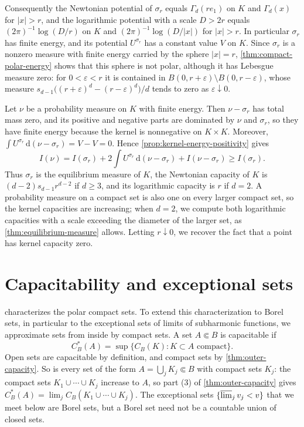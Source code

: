 \begin{example}
Consequently the Newtonian potential of $\sigma_r$ equals $\Gamma_d(re_1)$ on $K$ and $\Gamma_d(x)$ for $|x|>r$, and the logarithmic potential with a scale $D>2r$ equals $(2\pi)^{-1}\log(D/r)$ on $K$ and $(2\pi)^{-1}\log(D/|x|)$ for $|x|>r$. In particular $\sigma_r$ has finite energy, and its potential $U^{\sigma_r}$ has a constant value $V$ on $K$. Since $\sigma_r$ is a nonzero measure with finite energy carried by the sphere $|x|=r$, \cref{thm:compact-polar-energy} shows that this sphere is not polar, although it has Lebesgue measure zero: for $0<\varepsilon<r$ it is contained in $B(0,r+\varepsilon)\setminus B(0,r-\varepsilon)$, whose measure $s_{d-1}\bigl((r+\varepsilon)^d-(r-\varepsilon)^d\bigr)/d$ tends to zero as $\varepsilon\downarrow0$.

Let $\nu$ be a probability measure on $K$ with finite energy. Then $\nu-\sigma_r$ has total mass zero, and its positive and negative parts are dominated by $\nu$ and $\sigma_r$, so they have finite energy because the kernel is nonnegative on $K\times K$. Moreover, $\int U^{\sigma_r}\,\mathrm d(\nu-\sigma_r)=V-V=0$. Hence \cref{prop:kernel-energy-positivity} gives
\[
 I(\nu)=I(\sigma_r)+2\int U^{\sigma_r}\,\mathrm d(\nu-\sigma_r)+I(\nu-\sigma_r)\geq I(\sigma_r).
\]
Thus $\sigma_r$ is the equilibrium measure of $K$, the Newtonian capacity of $K$ is $(d-2)s_{d-1}r^{d-2}$ if $d\geq3$, and its logarithmic capacity is $r$ if $d=2$. A probability measure on a compact set is also one on every larger compact set, so the kernel capacities are increasing; when $d=2$, we compute both logarithmic capacities with a scale exceeding the diameter of the larger set, as \cref{thm:equilibrium-measure} allows. Letting $r\downarrow0$, we recover the fact that a point has kernel capacity zero.
\end{example}

\section{Capacitability and exceptional sets}
\label{sec:capacitable-exceptions}
 characterizes the polar compact sets. To extend this characterization to Borel sets, in particular to the exceptional sets of limits of subharmonic functions, we approximate sets from inside by compact sets. A set $A\Subset B$ is capacitable if
\[
 C_B^*(A)=\sup\{C_B(K):K\subset A\text{ compact}\}.
\]
Open sets are capacitable by definition, and compact sets by \cref{thm:outer-capacity}. So is every set of the form $A=\bigcup_jK_j\Subset B$ with compact sets $K_j$: the compact sets $K_1\cup\cdots\cup K_j$ increase to $A$, so part (3) of \cref{thm:outer-capacity} gives $C_B^*(A)=\lim_jC_B(K_1\cup\cdots\cup K_j)$. The exceptional sets $\{\varlimsup_jv_j<v\}$ that we meet below are Borel sets, but a Borel set need not be a countable union of closed sets.

